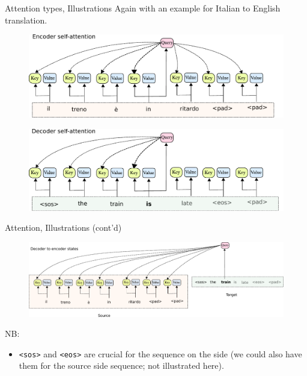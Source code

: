 \begin{frame}{Attention types, Illustrations}
\vspace{-5mm}
\scriptsize{Again with an example for Italian to English translation.}
\begin{figure}
   \begin{center}
     \includegraphics[width=0.7\linewidth]{figures/trafo_masks_enc_enc.pdf}
   \end{center}
\end{figure}
\vspace{5mm}
\begin{figure}
\vspace{-5mm}
   \begin{center}
     \includegraphics[width=0.7\linewidth]{figures/trafo_masks_dec_dec.pdf}
   \end{center}
\end{figure}
\end{frame}


\begin{frame}{Attention, Illustrations (cont'd)}
\begin{figure}
   \begin{center}
     \includegraphics[width=1.0\linewidth]{figures/trafo_masks_dec_enc.pdf}
   \end{center}
\end{figure}
NB: 
\begin{itemize}
\item \texttt{<sos>} and \texttt{<eos>} are crucial for the sequence on the  side
(we could also have them for the source side sequence; not illustrated here).
\end{itemize}
\end{frame}


